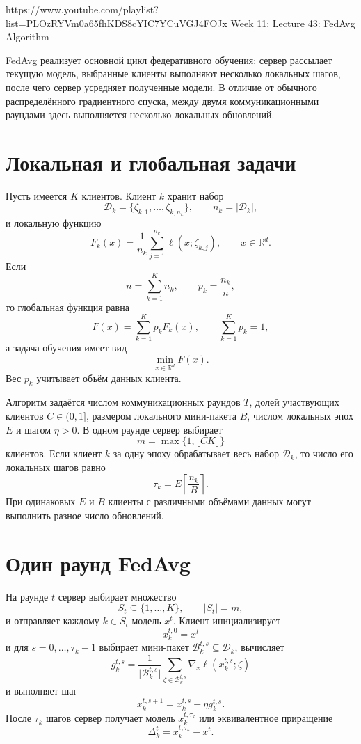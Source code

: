 
\sourcevideo
    {https://www.youtube.com/playlist?list=PLOzRYVm0a65fhKDS8cYIC7YCuVGJ4FOJx}
    {Week 11: Lecture 43: FedAvg Algorithm}

FedAvg реализует основной цикл федеративного обучения: сервер
рассылает текущую модель, выбранные клиенты выполняют несколько
локальных шагов, после чего сервер усредняет полученные модели. В
отличие от обычного распределённого градиентного спуска, между двумя
коммуникационными раундами здесь выполняется несколько локальных
обновлений.

\section{Локальная и глобальная задачи}

Пусть имеется \(K\) клиентов. Клиент \(k\) хранит набор
\[
    \mathcal D_k
    =
    \{\zeta_{k,1},\ldots,\zeta_{k,n_k}\},
    \qquad
    n_k=\lvert\mathcal D_k\rvert,
\]
и локальную функцию
\[
    F_k(x)
    =
    \frac1{n_k}
    \sum_{j=1}^{n_k}
    \ell(x;\zeta_{k,j}),
    \qquad
    x\in\mathbb R^d.
\]
Если
\[
    n=\sum_{k=1}^{K}n_k,
    \qquad
    p_k=\frac{n_k}{n},
\]
то глобальная функция равна
\[
    F(x)
    =
    \sum_{k=1}^{K}p_kF_k(x),
    \qquad
    \sum_{k=1}^{K}p_k=1,
\]
а задача обучения имеет вид
\[
    \min_{x\in\mathbb R^d}F(x).
\]
Вес \(p_k\) учитывает объём данных клиента.

Алгоритм задаётся числом коммуникационных раундов \(T\), долей
участвующих клиентов \(C\in(0,1]\), размером локального мини-пакета
\(B\), числом локальных эпох \(E\) и шагом \(\eta>0\). В одном
раунде сервер выбирает
\[
    m=\max\{1,\lfloor CK\rfloor\}
\]
клиентов. Если клиент \(k\) за одну эпоху обрабатывает весь набор
\(\mathcal D_k\), то число его локальных шагов равно
\[
    \tau_k
    =
    E\left\lceil\frac{n_k}{B}\right\rceil.
\]
При одинаковых \(E\) и \(B\) клиенты с различными объёмами данных
могут выполнить разное число обновлений.

\section{Один раунд FedAvg}

На раунде \(t\) сервер выбирает множество
\[
    S_t\subseteq\{1,\ldots,K\},
    \qquad
    \lvert S_t\rvert=m,
\]
и отправляет каждому \(k\in S_t\) модель \(x^t\). Клиент
инициализирует
\[
    x_k^{t,0}=x^t
\]
и для \(s=0,\ldots,\tau_k-1\) выбирает мини-пакет
\(\mathcal B_k^{t,s}\subseteq\mathcal D_k\), вычисляет
\[
    g_k^{t,s}
    =
    \frac1{\lvert\mathcal B_k^{t,s}\rvert}
    \sum_{\zeta\in\mathcal B_k^{t,s}}
    \nabla_x\ell(x_k^{t,s};\zeta)
\]
и выполняет шаг
\[
    x_k^{t,s+1}
    =
    x_k^{t,s}-\eta g_k^{t,s}.
\]
После \(\tau_k\) шагов сервер получает модель
\(x_k^{t,\tau_k}\) или эквивалентное приращение
\[
    \Delta_k^t
    =
    x_k^{t,\tau_k}-x^t.
\]


